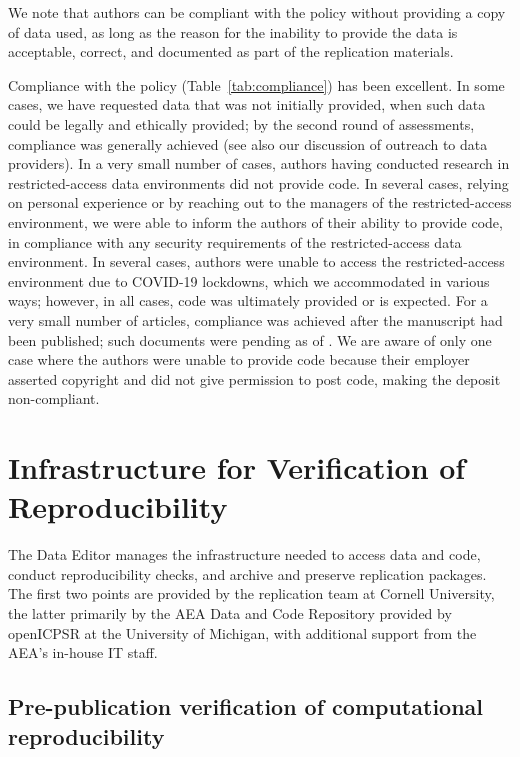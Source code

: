 \documentclass[PP]{AEA}
\newcommand{\aeadcr}{AEA Data and Code Repository}
\begin{document}
We note that authors can be compliant with the policy without providing a copy of data used, as long as the reason for the inability to provide the data is acceptable, correct, and documented as part of the replication materials. 

Compliance with the policy (Table~\ref{tab:compliance}) has been excellent. In some cases, we have requested data that was not initially provided, when such data could be legally and ethically provided; by the second round of assessments, compliance was generally achieved (see also our discussion of outreach to data providers). In a very small number of cases, authors having conducted research in restricted-access data environments did not provide code. In several cases, relying on personal experience or by reaching out to the managers of the restricted-access environment, we were able to inform the authors of their ability to provide code, in compliance with any security requirements of the restricted-access data environment. In several cases, authors were unable to access the restricted-access environment due to COVID-19 lockdowns, which we accommodated in various ways; however, in all cases, code was ultimately provided or is expected. For a very small number of articles, compliance was achieved after the manuscript had been published; \mcpubincmplt such documents were pending as of \firstday{}. We are aware of only one case where the authors were unable to provide code because their employer asserted copyright and did not give permission to post code, making the deposit non-compliant.


\section{Infrastructure for Verification of Reproducibility}
\label{sec:infrastructure}

The Data Editor manages the infrastructure needed to access data and code, conduct reproducibility checks, and archive and preserve replication packages. The first two points are provided by the replication team at Cornell University, the latter primarily by the  \aeadcr{} provided by openICPSR at the University of Michigan, with additional support from the AEA's in-house IT staff. 


\subsection{Pre-publication verification of computational reproducibility}
\label{sec:verification}
\end{document}
